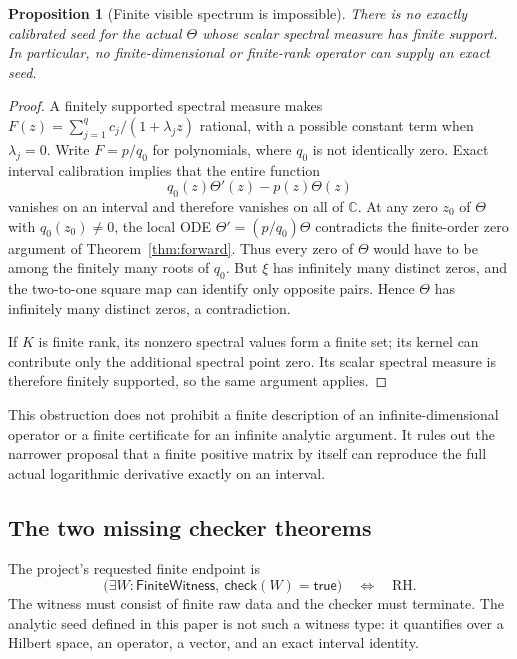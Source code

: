 \documentclass[11pt,a4paper]{article}
\numberwithin{equation}{section}
\newtheorem{proposition}[theorem]{Proposition}
\theoremstyle{definition}
\theoremstyle{remark}
\newcommand{\C}{\mathbb C}
\newcommand{\RH}{\mathrm{RH}}
\begin{document}
\begin{proposition}[Finite visible spectrum is impossible]\label{prop:finite-obstruction}
There is no exactly calibrated seed for the actual $\Theta$ whose
scalar spectral measure has finite support. In particular, no
finite-dimensional or finite-rank operator can supply an exact seed.
\end{proposition}
\begin{proof}
A finitely supported spectral measure makes
$F(z)=\sum_{j=1}^q c_j/(1+\lambda_jz)$ rational, with a possible
constant term when $\lambda_j=0$. Write $F=p/q_0$ for polynomials,
where $q_0$ is not identically zero. Exact interval calibration implies
that the entire function
\[
q_0(z)\Theta'(z)-p(z)\Theta(z)
\]
vanishes on an interval and therefore vanishes on all of $\C$.
At any zero $z_0$ of $\Theta$ with $q_0(z_0)\ne0$, the local
ODE $\Theta'=(p/q_0)\Theta$ contradicts the finite-order zero
argument of Theorem~\ref{thm:forward}. Thus every zero of $\Theta$
would have to be among the finitely many roots of $q_0$.
But $\xi$ has infinitely many distinct zeros, and the two-to-one
square map can identify only opposite pairs. Hence $\Theta$ has
infinitely many distinct zeros, a contradiction.

If $K$ is finite rank, its nonzero spectral values form a finite set;
its kernel can contribute only the additional spectral point zero.
Its scalar spectral measure is therefore finitely supported, so the
same argument applies.
\end{proof}

This obstruction does not prohibit a finite description of an
infinite-dimensional operator or a finite certificate for an infinite
analytic argument. It rules out the narrower proposal that a finite
positive matrix by itself can reproduce the full actual logarithmic
derivative exactly on an interval.

\subsection{The two missing checker theorems}

The project's requested finite endpoint is
\begin{equation}\label{eq:finite-goal}
\bigl(\exists W:\mathsf{FiniteWitness},\ \mathsf{check}(W)=\mathsf{true}\bigr)
\quad\Longleftrightarrow\quad\RH.
\end{equation}
The witness must consist of finite raw data and the checker must
terminate. The analytic seed defined in this paper is not such a
witness type: it quantifies over a Hilbert space, an operator, a vector,
and an exact interval identity.
\end{document}
